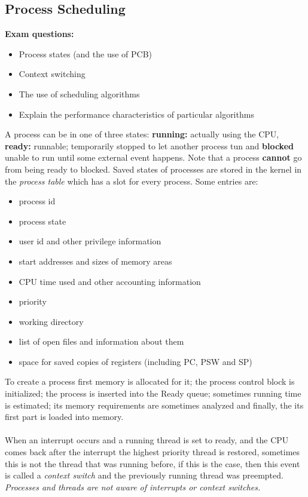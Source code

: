 \documentclass[twoside]{article}
\begin{document}
\subsection{Process Scheduling}
\textbf{Exam questions:}
\begin{itemize}
\item Process states (and the use of PCB)
\item Context switching
\item The use of scheduling algorithms
\item Explain the performance characteristics of particular algorithms
\end{itemize}
A process can be in one of three states: \textbf{running:} actually using the CPU, \textbf{ready:} runnable; temporarily stopped to let another process tun and \textbf{blocked} unable to run until some external event happens. Note that a process \textbf{cannot} go from being ready to blocked. Saved states of processes are stored in the kernel in the \emph{process table} which has a slot for every process. Some entries are:
\begin{itemize}
\item process id
\item process state
\item user id and other privilege information
\item start addresses and sizes of memory areas
\item CPU time used and other accounting information
\item priority
\item working directory
\item list of open files and information about them
\item space for saved copies of registers (including PC, PSW and SP)
\end{itemize}
To create a process first memory is allocated for it; the process control block is initialized; the process is inserted into the Ready queue; sometimes running time is estimated; its memory requirements are sometimes analyzed and finally, the its first part is loaded into memory. \\ \\
When an interrupt occurs and a running thread is set to ready, and the CPU comes back after the interrupt the highest priority thread is restored, sometimes this is not the thread that was running before, if this is the case, then this event is called a \emph{context switch} and the previously running thread was preempted. \emph{Processes and threads are not aware of interrupts or context switches.} \\ \\
\end{document}
